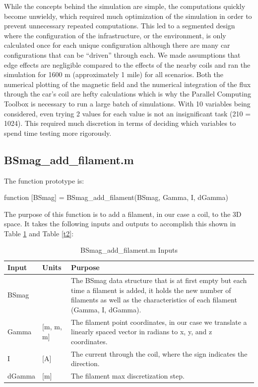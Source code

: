 While the concepts behind the simulation are simple, the computations quickly become unwieldy, 
which required much optimization of the simulation in order to prevent unnecessary repeated computations. 
This led to a segmented design where the configuration of the infrastructure, or the environment, is only 
calculated once for each unique configuration although there are many car configurations that can be “driven” 
through each. We made assumptions that edge effects are negligible compared to the effects of the nearby coils 
and ran the simulation for 1600 m (approximately 1 mile) for all scenarios. Both the numerical plotting of the 
magnetic field and the numerical integration of the flux through the car’s coil are hefty calculations which is 
why the Parallel Computing Toolbox is necessary to run a large batch of simulations. With 10 variables being 
considered, even trying 2 values for each value is not an insignificant task (210 = 1024). This required much 
discretion in terms of deciding which variables to spend time testing more rigorously. 

\subsection{BSmag\_add\_filament.m}
The function prototype is:
\begin{center}
function [BSmag] = BSmag\_add\_filament(BSmag, Gamma, I, dGamma)
\end{center}
The purpose of this function is to add a filament, 
in our case a coil, to the 3D space. It takes the following 
inputs and outputs to accomplish this shown in Table \ref{t1} and Table \ref{t2}:

\begin{table}[H]
    \caption[BSmag\_add\_filament.m Inputs]{BSmag\_add\_filament.m Inputs}
    \begin{center}
    \begin{tabular}{| p{} | p{} | p{} |}
    \hline
    Input & Units & Purpose \\
    \hline \hline
    BSmag & & The BSmag data structure that is at first empty but each time a filament is added, it holds the new number of filaments as well as the characteristics of each filament (Gamma, I, dGamma). \\
    Gamma & [m, m, m] & The filament point coordinates, in our case we translate a linearly spaced vector in radians to x, y, and z coordinates. \\
    I & [A] & The current through the coil, where the sign indicates the direction. \\
    dGamma & [m] & The filament max discretization step. \\
    \hline
    \end{tabular}
    \end{center}
    \label{t1}
\end{table}

